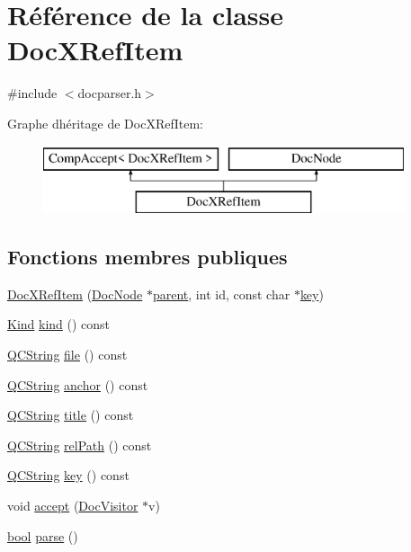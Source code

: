 \hypertarget{class_doc_x_ref_item}{}\section{Référence de la classe Doc\+X\+Ref\+Item}
\label{class_doc_x_ref_item}


{\ttfamily \#include $<$docparser.\+h$>$}

Graphe d\textquotesingle{}héritage de Doc\+X\+Ref\+Item\+:\begin{figure}[H]
\begin{center}
\leavevmode
\includegraphics[height=2.000000cm]{class_doc_x_ref_item}
\end{center}
\end{figure}
\subsection*{Fonctions membres publiques}
\begin{DoxyCompactItemize}
\item 
\hyperlink{class_doc_x_ref_item_a2dd2cde9203334f102bf5eb810b8f0a0}{Doc\+X\+Ref\+Item} (\hyperlink{class_doc_node}{Doc\+Node} $\ast$\hyperlink{class_doc_node_a990d8b983962776a647e6231d38bd329}{parent}, int id, const char $\ast$\hyperlink{class_doc_x_ref_item_a76ee124dbf5e2d54385f2283238be615}{key})
\item 
\hyperlink{class_doc_node_aebd16e89ca590d84cbd40543ea5faadb}{Kind} \hyperlink{class_doc_x_ref_item_a107c0e90e9bcc41dac53e2c8a344cdcc}{kind} () const 
\item 
\hyperlink{class_q_c_string}{Q\+C\+String} \hyperlink{class_doc_x_ref_item_a204729af034545a874012cf7b71e4b28}{file} () const 
\item 
\hyperlink{class_q_c_string}{Q\+C\+String} \hyperlink{class_doc_x_ref_item_aa85182414cd5d840cb9a3fa2c6d6b6e4}{anchor} () const 
\item 
\hyperlink{class_q_c_string}{Q\+C\+String} \hyperlink{class_doc_x_ref_item_af9f7bd45776ade78957b099599977ac2}{title} () const 
\item 
\hyperlink{class_q_c_string}{Q\+C\+String} \hyperlink{class_doc_x_ref_item_a020ecca9ba54b05e0f034b8dbae55ddf}{rel\+Path} () const 
\item 
\hyperlink{class_q_c_string}{Q\+C\+String} \hyperlink{class_doc_x_ref_item_a76ee124dbf5e2d54385f2283238be615}{key} () const 
\item 
void \hyperlink{class_doc_x_ref_item_a4850d4a3b5fe80bbbcec8433276a5cb7}{accept} (\hyperlink{class_doc_visitor}{Doc\+Visitor} $\ast$v)
\item 
\hyperlink{qglobal_8h_a1062901a7428fdd9c7f180f5e01ea056}{bool} \hyperlink{class_doc_x_ref_item_acfb3aacf4b559a4b9fb4fb5b2dc960bc}{parse} ()
\end{DoxyCompactItemize}

